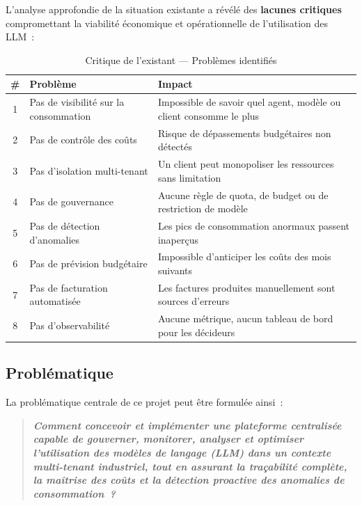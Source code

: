L'analyse approfondie de la situation existante a révélé des \textbf{lacunes critiques} compromettant la viabilité économique et opérationnelle de l'utilisation des LLM~:

\begin{table}[H]
\centering
\caption{Critique de l'existant --- Problèmes identifiés}
\label{tab:critique_existant}
\begin{tabularx}{\textwidth}{|c|p{4.5cm}|X|}
\hline
\textbf{\#} & \textbf{Problème} & \textbf{Impact} \\
\hline
1 & Pas de visibilité sur la consommation & Impossible de savoir quel agent, modèle ou client consomme le plus \\
\hline
2 & Pas de contrôle des coûts & Risque de dépassements budgétaires non détectés \\
\hline
3 & Pas d'isolation multi-tenant & Un client peut monopoliser les ressources sans limitation \\
\hline
4 & Pas de gouvernance & Aucune règle de quota, de budget ou de restriction de modèle \\
\hline
5 & Pas de détection d'anomalies & Les pics de consommation anormaux passent inaperçus \\
\hline
6 & Pas de prévision budgétaire & Impossible d'anticiper les coûts des mois suivants \\
\hline
7 & Pas de facturation automatisée & Les factures produites manuellement sont sources d'erreurs \\
\hline
8 & Pas d'observabilité & Aucune métrique, aucun tableau de bord pour les décideurs \\
\hline
\end{tabularx}
\end{table}


\subsection{Problématique}

La problématique centrale de ce projet peut être formulée ainsi~:

\begin{quote}
\textit{\textbf{Comment concevoir et implémenter une plateforme centralisée capable de gouverner, monitorer, analyser et optimiser l'utilisation des modèles de langage (LLM) dans un contexte multi-tenant industriel, tout en assurant la traçabilité complète, la maîtrise des coûts et la détection proactive des anomalies de consommation~?}}
\end{quote}

